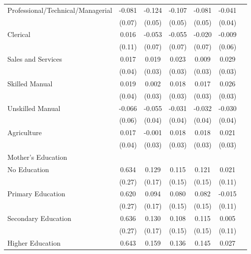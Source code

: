 \begin{longtable}{l*{6}{c}}
\hspace{1em}Professional/Technical/Managerial & -0.081 & -0.124\sym{**} & -0.107\sym{**} & -0.081 & -0.041 \\
                    & (0.07) & (0.05) & (0.05) & (0.05) & (0.04) \\
\hspace{1em}Clerical & 0.016 & -0.053 & -0.055 & -0.020 & -0.009 \\
                    & (0.11) & (0.07) & (0.07) & (0.07) & (0.06) \\
\hspace{1em}Sales and Services & 0.017 & 0.019 & 0.023 & 0.009 & 0.029 \\
                    & (0.04) & (0.03) & (0.03) & (0.03) & (0.03) \\
\hspace{1em}Skilled Manual & 0.019 & 0.002 & 0.018 & 0.017 & 0.026 \\
                    & (0.04) & (0.03) & (0.03) & (0.03) & (0.03) \\
\hspace{1em}Unskilled Manual & -0.066 & -0.055 & -0.031 & -0.032 & -0.030 \\
                    & (0.06) & (0.04) & (0.04) & (0.04) & (0.04) \\
\hspace{1em}Agriculture & 0.017 & -0.001 & 0.018 & 0.018 & 0.021 \\
                    & (0.04) & (0.03) & (0.03) & (0.03) & (0.03) \\
\multicolumn{6}{l}{Mother's Education} \\
\hspace{1em}No Education & 0.634\sym{**} & 0.129 & 0.115 & 0.121 & 0.021 \\
                    & (0.27) & (0.17) & (0.15) & (0.15) & (0.11) \\
\hspace{1em}Primary Education & 0.620\sym{**} & 0.094 & 0.080 & 0.082 & -0.015 \\
                    & (0.27) & (0.17) & (0.15) & (0.15) & (0.11) \\
\hspace{1em}Secondary Education & 0.636\sym{**} & 0.130 & 0.108 & 0.115 & 0.005 \\
                    & (0.27) & (0.17) & (0.15) & (0.15) & (0.11) \\
\hspace{1em}Higher Education & 0.643\sym{**} & 0.159 & 0.136 & 0.145 & 0.027 \\

\end{longtable}
